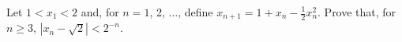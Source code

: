 Let $1 < x_1 < 2$ and, for $n = 1$,  2, $\dots$,  define $x_{n + 1} = 1 + x_n - \frac{1}{2} x_n^2$.  Prove that, for $n \ge 3$,  $|x_n - \sqrt{2}| < 2^{-n}$.